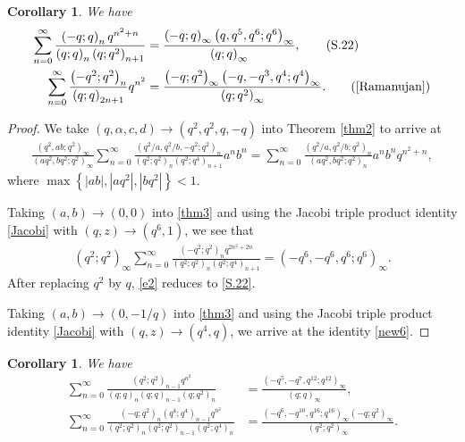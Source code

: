 \documentclass[reqno,12pt]{amsart}
\newtheorem{corollary}[theorem]{Corollary}
\theoremstyle{remark}
\numberwithin{equation}{section}
\begin{document}
\begin{corollary}
We have
\begin{align}
\sum_{n=0}^{\infty}\frac{\left(-q;q\right)_nq^{n^2+n}}
{\left(q;q\right)_n\left(q;q^2\right)_{n+1}}
&=
\frac{\left(-q;q\right)_{\infty}\left(q,q^5,q^6;q^6\right)_{\infty}}
{\left(q;q\right)_{\infty}},\tag{S.22}\label{S.22}\\
\sum_{n=0}^{\infty}\frac{\left(-q^2;q^2\right)_n}
{\left(q;q\right)_{2n+1}}q^{n^2}
&=\frac{\left(-q;q^2\right)_{\infty}\left(-q,-q^3,q^4;q^4\right)_{\infty}}{\left(q;q^2\right)_{\infty}
}.\tag{\rm{\cite[Entry 1.7.13]{Ramanujan}}}\label{new6}
\end{align}
\end{corollary}
\begin{proof}
We take $\left(q,\alpha,c,d\right)\to\left(q^2,q^2,q,-q\right)$ into Theorem \ref{thm2} to arrive at
\begin{align}
\frac{\left(q^2,ab;q^2\right)_{\infty}}{\left(aq^2,bq^2;q^2\right)_{\infty}}
\sum_{n=0}^{\infty}\frac{\left(q^2/a,q^2/b,-q^2;q^2\right)_n}
{\left(q^2;q^2\right)_n\left(q^2;q^4\right)_{n+1}}a^nb^n
=
\sum_{n=0}^{\infty}\frac{\left(q^2/a,q^2/b;q^2\right)_n}
{\left(aq^2,bq^2;q^2\right)_n}a^nb^nq^{n^2+n},\label{thm3}
\end{align}
where $\max\left\{|ab|,|aq^2|,|bq^2|\right\}<1$.

Taking $\left(a,b\right)\to\left(0,0\right)$ into \eqref{thm3} and using the Jacobi triple product identity \eqref{Jacobi} with $\left(q,z\right)\to\left(q^6,1\right)$, we see that
\begin{align}
\left(q^2;q^2\right)_{\infty}
\sum_{n=0}^{\infty}\frac{\left(-q^2;q^2\right)_nq^{2n^2+2n}}
{\left(q^2;q^2\right)_n\left(q^2;q^4\right)_{n+1}}
=\left(-q^6,-q^6,q^6;q^6\right)_{\infty}.\label{e2}
\end{align}
After replacing $q^2$ by $q$, \eqref{e2} reduces to \eqref{S.22}.

Taking $\left(a,b\right)\to\left(0,-1/q\right)$ into \eqref{thm3} and using the Jacobi triple product identity \eqref{Jacobi} with $\left(q,z\right)\to\left(q^4,q\right)$, we arrive at the identity \ref{new6}.
\end{proof}
\begin{corollary}
We have
\begin{align}
\sum_{n=0}^{\infty}\frac{\left(q^2;q^2\right)_{n-1}q^{n^2}}
{\left(q;q\right)_n\left(q;q\right)_{n-1}\left(q;q^2\right)_n}
&=\frac{\left(-q^5,-q^7,q^{12};q^{12}\right)_{\infty}}{\left(q;q\right)_{\infty}}
,\tag{S.58}\label{S.58}\\
\sum_{n=0}^{\infty}\frac{\left(-q;q^2\right)_{n}\left(q^4;q^4\right)_{n-1}q^{n^2}}
{\left(q^2;q^2\right)_n\left(q^2;q^2\right)_{n-1}\left(q^2;q^4\right)_n}
&=\frac{\left(-q^6,-q^{10},q^{16};q^{16}\right)_{\infty}
\left(-q;q^2\right)_{\infty}}
{\left(q^2;q^2\right)_{\infty}}
.\tag{S.72}\label{S.72}
\end{align}
\end{corollary}
\end{document}
